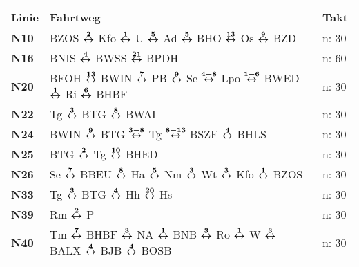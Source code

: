 \begin{minipage}[t]{0.45\textwidth}
\begin{tabular}{>{\bfseries}L{1.2cm}L{9.0cm}L{3.0cm}}
{\bfseries Linie} & {\bfseries Fahrtweg} & {\bfseries Takt} \\
\hline
\nbus{} N10   & BZOS $\xarwe{2}$ Kfo $\xarwe{1}$ U $\xarwe{5}$ Ad $\xarwe{5}$ BHO $\xarwe{13}$ Os $\xarwe{9}$ BZD                                                                   & n: 30                      \\
\nbus{} N16   & BNIS $\xarwe{4}$ BWSS $\xarwe{21}$ BPDH                                                                                                                             & n: 60                      \\
\nbus{} N20   & BFOH $\xarwe{13}$ BWIN $\xarwe{7}$ PB $\xarwe{9}$ Se $\xarwe{4-8}$ Lpo $\xarwe{1-6}$ BWED $\xarwe{1}$ Ri $\xarwe{6}$ BHBF                                           & n: 30                      \\
\nbus{} N22   & Tg $\xarwe{3}$ BTG $\xarwe{8}$ BWAI                                                                                                                                 & n: 30                      \\
\nbus{} N24   & BWIN $\xarwe{9}$ BTG $\xarwe{3-8}$ Tg $\xarwe{8-13}$ BSZF $\xarwe{4}$ BHLS
& n: 30                      \\
\nbus{} N25   & BTG $\xarwe{2}$ Tg $\xarwe{10}$ BHED                                                                                                                                & n: 30                      \\
\nbus{} N26   & Se $\xarwe{7}$ BBEU $\xarwe{8}$ Ha $\xarwe{5}$ Nm $\xarwe{3}$ Wt $\xarwe{3}$ Kfo $\xarwe{1}$ BZOS                                                                   & n: 30                      \\
\nbus{} N33   & Tg $\xarwe{3}$ BTG $\xarwe{4}$ Hh $\xarwe{20}$ Hs                                                                                                                   & n: 30                      \\
\nbus{} N39   & Rm $\xarwe{2}$ P                                                                                                                                                    & n: 30                      \\
\nbus{} N40   & Tm $\xarwe{7}$ BHBF $\xarwe{3}$ NA $\xarwe{1}$ BNB $\xarwe{3}$ Ro $\xarwe{1}$ W $\xarwe{3}$ BALX $\xarwe{4}$ BJB $\xarwe{4}$ BOSB                                   & n: 30                      \\

\end{tabular}
\end{minipage}
